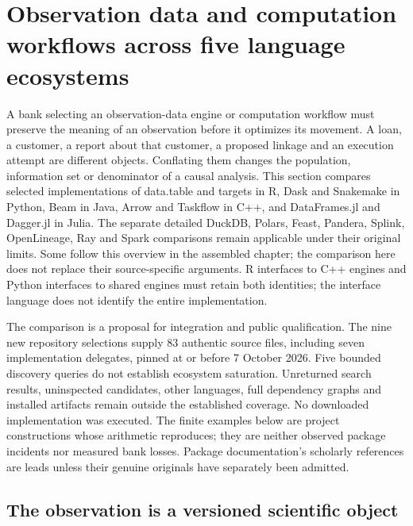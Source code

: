 \section[Observation data and computation workflows]{Observation data and computation workflows across five language ecosystems}
\label{sec:exec25-dww}

A bank selecting an observation-data engine or computation workflow must preserve the meaning of an observation before it optimizes its movement. A loan, a customer, a report about that customer, a proposed linkage and an execution attempt are different objects. Conflating them changes the population, information set or denominator of a causal analysis. This section compares selected implementations of data.table and targets in R, Dask and Snakemake in Python, Beam in Java, Arrow and Taskflow in C++, and DataFrames.jl and Dagger.jl in Julia. The separate detailed DuckDB, Polars, Feast, Pandera, Splink, OpenLineage, Ray and Spark comparisons remain applicable under their original limits. Some follow this overview in the assembled chapter; the comparison here does not replace their source-specific arguments. R interfaces to C++ engines and Python interfaces to shared engines must retain both identities; the interface language does not identify the entire implementation.~\citep{exec25_dww_datatable,exec25_dww_targets,exec25_dww_dask,exec25_dww_snakemake,exec25_dww_beam,exec25_dww_arrow,exec25_dww_taskflow,exec25_dww_dataframes,exec25_dww_dagger,exec19_duckdb_source,exec23_polars_sources,exec25_otm_spark}

The comparison is a proposal for integration and public qualification. The nine new repository selections supply 83 authentic source files, including seven implementation delegates, pinned at or before 7 October 2026. Five bounded discovery queries do not establish ecosystem saturation. Unreturned search results, uninspected candidates, other languages, full dependency graphs and installed artifacts remain outside the established coverage. No downloaded implementation was executed. The finite examples below are project constructions whose arithmetic reproduces; they are neither observed package incidents nor measured bank losses. Package documentation's scholarly references are leads unless their genuine originals have separately been admitted.~\citep{exec25_dww_choice}

\subsection{The observation is a versioned scientific object}

